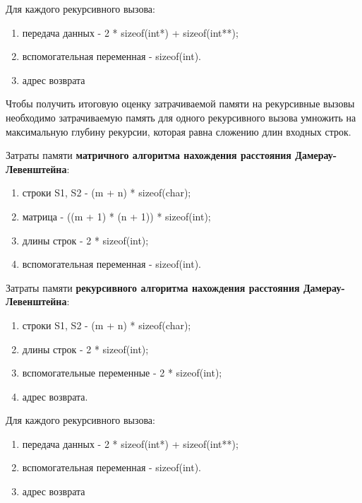 \documentclass[a4paper,12pt]{article}
\begin{document}
\vspace{\baselineskip}

Для каждого рекурсивного вызова:
\begin{enumerate}
	\item передача данных - 2 * sizeof(int*) + sizeof(int**);
	\item вспомогательная переменная -  sizeof(int).
	\item адрес возврата
\end{enumerate}

\vspace{\baselineskip}

Чтобы получить итоговую оценку затрачиваемой памяти на рекурсивные вызовы необходимо затрачиваемую память для одного рекурсивного вызова умножить на максимальную глубину рекурсии, которая равна сложению длин входных строк.\vspace{\baselineskip}

\vspace{\baselineskip}

Затраты памяти \textbf{матричного алгоритма нахождения расстояния Дамерау-Левенштейна}:\begin{enumerate}
	\item строки S1, S2 - (m + n) * sizeof(char);
	\item матрица - ((m + 1) * (n + 1)) * sizeof(int);
	\item длины строк - 2 * sizeof(int);
	\item вспомогательная переменная  - sizeof(int).
\end{enumerate}

\vspace{\baselineskip}

Затраты памяти \textbf{рекурсивного алгоритма нахождения расстояния Дамерау-Левенштейна}:\begin{enumerate}
	\item строки S1, S2 - (m + n) * sizeof(char);
\item длины строк - 2 * sizeof(int);
\item вспомогательные переменные -  2 * sizeof(int);
\item адрес возврата.
\end{enumerate}

\vspace{\baselineskip}

Для каждого рекурсивного вызова:
\begin{enumerate}
	\item передача данных - 2 * sizeof(int*) + sizeof(int**);
	\item вспомогательная переменная -  sizeof(int).
	\item адрес возврата
\end{enumerate}
\end{document}

